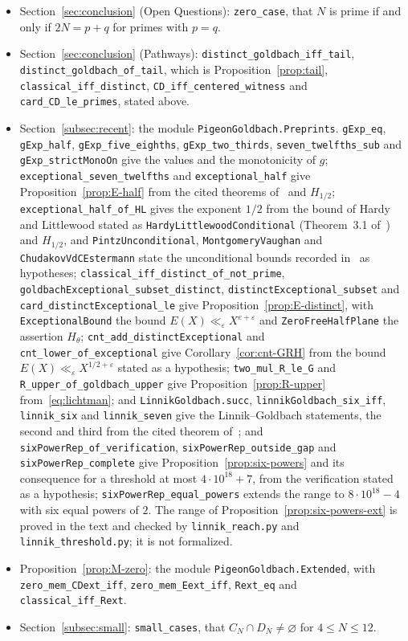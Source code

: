 \documentclass[11pt]{amsart}
\theoremstyle{definition}
\theoremstyle{remark}
\begin{document}
\begin{itemize}
\item Section~\ref{sec:conclusion} (Open Questions): \texttt{zero\_case}, that $N$ is prime if and only if $2N=p+q$ for primes with $p=q$.
\item Section~\ref{sec:conclusion} (Pathways): \texttt{distinct\_goldbach\_iff\_tail}, \texttt{distinct\_goldbach\_of\_tail}, which is Proposition~\ref{prop:tail}, \texttt{classical\_iff\_distinct}, \texttt{CD\_iff\_centered\_witness} and \texttt{card\_CD\_le\_primes}, stated above.
\item Section~\ref{subsec:recent}: the module \texttt{PigeonGoldbach.Preprints}. \texttt{gExp\_eq}, \texttt{gExp\_half}, \texttt{gExp\_five\_eighths}, \texttt{gExp\_two\_thirds}, \texttt{seven\_twelfths\_sub} and \texttt{gExp\_strictMonoOn} give the values and the monotonicity of $g$; \texttt{exceptional\_seven\_twelfths} and \texttt{exceptional\_half} give Proposition~\ref{prop:E-half} from the cited theorems of~\cite{pintz2026exceptional} and $H_{1/2}$; \texttt{exceptional\_half\_of\_HL} gives the exponent $1/2$ from the bound of Hardy and Littlewood stated as \texttt{HardyLittlewoodConditional} (Theorem~3.1 of~\cite{bhowmik2026exceptional}) and $H_{1/2}$, and \texttt{PintzUnconditional}, \texttt{MontgomeryVaughan} and \texttt{ChudakovVdCEstermann} state the unconditional bounds recorded in~\cite{bhowmik2026exceptional} as hypotheses; \texttt{classical\_iff\_distinct\_of\_not\_prime}, \texttt{goldbachExceptional\_subset\_distinct}, \texttt{distinctExceptional\_subset} and \texttt{card\_distinctExceptional\_le} give Proposition~\ref{prop:E-distinct}, with \texttt{ExceptionalBound} the bound $E(X)\ll_\varepsilon X^{e+\varepsilon}$ and \texttt{ZeroFreeHalfPlane} the assertion $H_\theta$; \texttt{cnt\_add\_distinctExceptional} and \texttt{cnt\_lower\_of\_exceptional} give Corollary~\ref{cor:cnt-GRH} from the bound $E(X)\ll_\varepsilon X^{1/2+\varepsilon}$ stated as a hypothesis; \texttt{two\_mul\_R\_le\_G} and \texttt{R\_upper\_of\_goldbach\_upper} give Proposition~\ref{prop:R-upper} from~\eqref{eq:lichtman}; and \texttt{LinnikGoldbach.succ}, \texttt{linnikGoldbach\_six\_iff}, \texttt{linnik\_six} and \texttt{linnik\_seven} give the Linnik--Goldbach statements, the second and third from the cited theorem of~\cite{johnston2026linnik}; and \texttt{sixPowerRep\_of\_verification}, \texttt{sixPowerRep\_outside\_gap} and \texttt{sixPowerRep\_complete} give Proposition~\ref{prop:six-powers} and its consequence for a threshold at most $4\cdot 10^{18}+7$, from the verification stated as a hypothesis; \texttt{sixPowerRep\_equal\_powers} extends the range to $8\cdot 10^{18}-4$ with six equal powers of $2$. The range of Proposition~\ref{prop:six-powers-ext} is proved in the text and checked by \texttt{linnik\_reach.py} and \texttt{linnik\_threshold.py}; it is not formalized.
\item Proposition~\ref{prop:M-zero}: the module \texttt{PigeonGoldbach.Extended}, with \texttt{zero\_mem\_CDext\_iff}, \texttt{zero\_mem\_Eext\_iff}, \texttt{Rext\_eq} and \texttt{classical\_iff\_Rext}.
\item Section~\ref{subsec:small}: \texttt{small\_cases}, that $C_N\cap D_N\neq\varnothing$ for $4\leq N\leq 12$.
\end{itemize}
\end{document}
